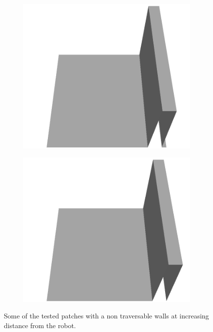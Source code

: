 \documentclass[../document.tex]{subfiles}
\begin{document}
\begin{figure}[htbp]
\begin{subfigure}[b]{0.24\textwidth}
    \includegraphics[width=\linewidth]{../img/5/custom_patches/walls_front/all/21-3d.png}
    \end{subfigure}
    \begin{subfigure}[b]{0.24\textwidth}
    \includegraphics[width=\linewidth]{../img/5/custom_patches/walls_front/all/24-3d.png}
    \end{subfigure}
    \caption{Some of the tested patches with a non traversable walls at increasing distance from the robot.}
\label{fig: wall-distance}
    \end{figure}
\end{document}
